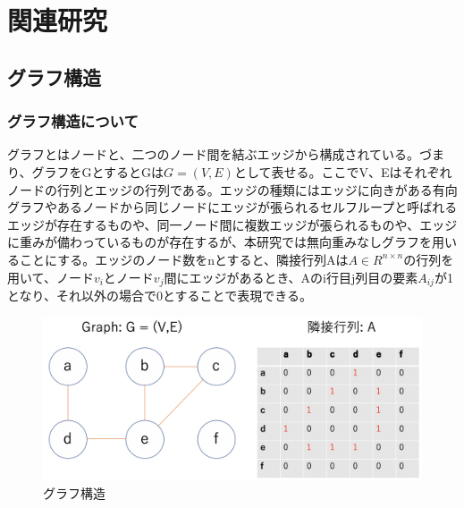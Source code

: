 \chapter{関連研究}

\section{グラフ構造}
\subsection{グラフ構造について}
グラフとはノードと、二つのノード間を結ぶエッジから構成されている。づまり、グラフをGとするとGは$G=(V,E)$として表せる。ここでV、Eはそれぞれノードの行列とエッジの行列である。エッジの種類にはエッジに向きがある有向グラフやあるノードから同じノードにエッジが張られるセルフループと呼ばれるエッジが存在するものや、同一ノード間に複数エッジが張られるものや、エッジに重みが備わっているものが存在するが、本研究では無向重みなしグラフを用いることにする。エッジのノード数をnとすると、隣接行列Aは$A \in R^{n\times n}$の行列を用いて、ノード$v_i$とノード$v_j$間にエッジがあるとき、Aのi行目j列目の要素$A_{ij}$が1となり、それ以外の場合で0とすることで表現できる。

\begin{figure}[h]
  \centering
  \includegraphics[width=0.7\hsize]{figures/graph_structure.pdf}
  \caption{グラフ構造}
  \label{fig:ex1}
\end{figure}

